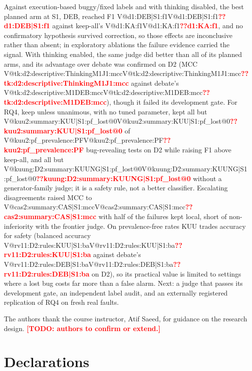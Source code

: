 \documentclass[pdflatex,iicol,sn-mathphys-num]{sn-jnl}
\makeatletter
\newcommand{\V}[1]{\ifcsname V@#1\endcsname\csname V@#1\endcsname\else\textbf{\textcolor{red}{??#1}}\fi}
\newcommand{\TODO}[1]{\textbf{\textcolor{red}{[TODO: #1]}}}
\makeatother
\begin{document}
Against execution-based buggy/fixed labels and with thinking disabled, the best planned arm at S1, DEB, reached F1 \V{d1:DEB|S1:f1} against keep-all's \V{d1:KA:f1}, and no confirmatory hypothesis survived correction, so those effects are inconclusive rather than absent; in exploratory ablations the failure evidence carried the signal. With thinking enabled, the same judge did better than all of its planned arms, and its advantage over debate was confirmed on D2 (MCC \V{tk:d2:descriptive:ThinkingM1J1:mcc} against debate's \V{tk:d2:descriptive:M1DEB:mcc}), though it failed its development gate. For RQ4, keep unless unanimous, with no tuned parameter, kept all but \V{kuu2:summary:KUU|S1:pf_lost@0} of \V{kuu2:pf_prevalence:PF} bug-revealing tests on D2 while raising F1 above keep-all, and all but \V{kuung:D2:summary:KUUNG|S1:pf_lost@0} without a generator-family judge; it is a safety rule, not a better classifier. Escalating disagreements raised MCC to \V{cas2:summary:CAS|S1:mcc} with half of the failures kept local, short of non-inferiority with the frontier judge. On prevalence-free rates KUU trades accuracy for safety (balanced accuracy \V{rv11:D2:rules:KUU|S1:ba} against debate's \V{rv11:D2:rules:DEB|S1:ba} on D2), so its practical value is limited to settings where a lost bug costs far more than a false alarm. Next: a judge that passes its development gate, an independent label audit, and an externally registered replication of RQ4 on fresh real faults.

\backmatter

The authors thank the course instructor, Atif Saeed, for guidance on the research design. \TODO{authors to confirm or extend.}

\section*{Declarations}
\end{document}
